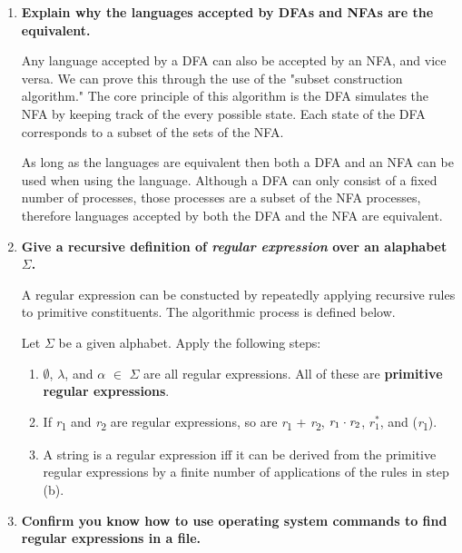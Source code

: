 \documentclass{article}
\begin{document}
\begin{enumerate}
    \medskip

    \item \textbf{Explain why the languages accepted by DFAs and NFAs are the equivalent.}
    
    \medskip

    \-\hspace{0.5cm} Any language accepted by a DFA can also be accepted by an NFA,
     and vice versa. We can prove this through the use of the "subset construction
     algorithm." The core principle of this algorithm is the DFA simulates the NFA
     by keeping track of the every possible state. Each state of the DFA corresponds
     to a subset of the sets of the NFA.

     \-\hspace{0.5cm} As long as the languages are equivalent then both a DFA and an 
     NFA can be used when using the language. Although a DFA can only consist of a 
     fixed number of processes, those processes are a subset of the NFA processes,
     therefore languages accepted by both the DFA and the NFA are equivalent.

    \medskip

    \item \textbf{Give a recursive definition of \textit{regular expression} over
            an alaphabet $\Sigma$.}

    \medskip

    \-\hspace{0.5cm} A regular expression can be constucted by repeatedly applying
    recursive rules to primitive constituents. The algorithmic process is defined 
    below.

    \-\hspace{0.5cm} Let $\Sigma$ be a given alphabet. Apply the following steps:

    \begin{enumerate}
        \item $\emptyset$, $\lambda$, and $\alpha$ $\in$ $\Sigma$ are all regular
        expressions. All of these are \textbf{primitive regular expressions}.
        \item If \textit{r}\textsubscript{1} and \textit{r}\textsubscript{2} are
        regular expressions, so are \textit{r}\textsubscript{1} + 
        \textit{r}\textsubscript{2}, $\textit{r}\textsubscript{1} \cdot
        \textit{r}\textsubscript{2}$, $r_1^*$, and (\textit{r}\textsubscript{1}).
        \item A string is a regular expression iff it can be derived from the 
        primitive regular expressions by a finite number of applications of the
        rules in step (b).
    \end{enumerate}


    \medskip

    \item \textbf{Confirm you know how to use operating system commands to find
            regular expressions in a file.}

    \medskip


    \medskip
\end{enumerate}
\end{document}
